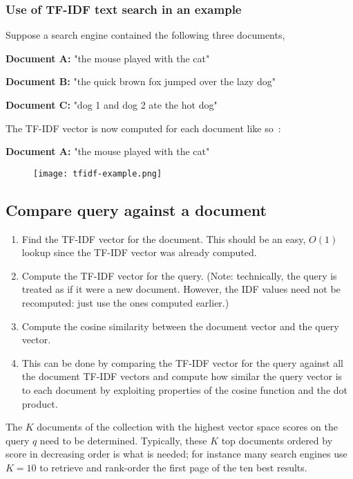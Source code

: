 \subsubsection{Use of TF-IDF text search in an example}

Suppose a search engine contained the following three documents,

\textbf{Document A:} "the mouse played with the cat"

\textbf{Document B:} "the quick brown fox jumped over the lazy dog"

\textbf{Document C:} "dog 1 and dog 2 ate the hot dog"

The TF-IDF vector is now computed for each document like so~\cite{tfidfExample}:

\textbf{Document A:} "the mouse played with the cat"
\begin{figure}[h!]
    \texttt{[image: tfidf-example.png]}
\end{figure}

\subsection{Compare query against a document}
\begin{enumerate}
    \item Find the TF-IDF vector for the document. This should be an easy, $O(1)$ lookup since the TF-IDF vector was already computed.
    \item Compute the TF-IDF vector for the query. (Note: technically, the query is treated as if it were a new document. 
    However, the IDF values need not be recomputed: just use the ones computed earlier.)
    \item Compute the cosine similarity between the document vector and the query vector.
    \item This can be done by comparing the TF-IDF vector for the query against all the document TF-IDF vectors and compute how similar 
    the query vector is to each document by exploiting properties of the cosine function and the dot product.
\end{enumerate}

The $K$ documents of the collection with the highest vector space 
scores on the query $q$ need to be determined. Typically, these $K$ top documents ordered by 
score in decreasing order is what is needed; for instance many search engines use $K = 10$ to retrieve 
and rank-order the first page of the ten best results.~\cite{tfidfExample}

